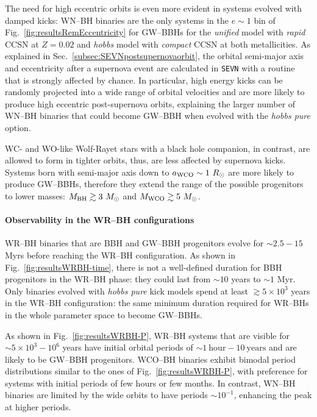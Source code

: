 \documentclass[a4paper,titlepage]{book}     	%
\newcommand{\sun}{\ensuremath{_\odot}}
\newcommand{\msun}{\ensuremath{M\sun}}
\newcommand{\rsun}{R_{\odot}}
\begin{document}
The need for high eccentric orbits is even more evident in systems evolved with damped kicks: WN--BH binaries are the only systems in the $e \sim 1$ bin of Fig.\ \ref{fig:resultsRemEccentricity} for GW--BBHs for the \emph{unified} model with \emph{rapid} CCSN at $Z=0.02$ and \emph{hobbs} model with \emph{compact} CCSN at both metallicities. As explained in Sec.\ \ref{subsec:SEVNpostsupernovaorbit}, the orbital semi-major axis and eccentricity after a supernova event are calculated in \texttt{SEVN} with a routine that is strongly affected by chance. In particular, high energy kicks can be randomly projected into a wide range of orbital velocities and are more likely to produce high eccentric post-supernova orbits, explaining the larger number of WN--BH binaries that could become GW--BBH when evolved with the \emph{hobbs pure} option.

WC- and WO-like Wolf-Rayet stars with a black hole companion, in contrast, are allowed to form in tighter orbits, thus, are less affected by supernova kicks. Systems born with semi-major axis down to $a_{\rm WCO} \sim 1~\rsun$ are more likely to produce GW--BBHs, therefore they extend the range of the possible progenitors to lower masses: $M_{\rm BH} \gtrsim 3~\msun$ and $M_{\rm WCO} \gtrsim 5~\msun$.


\paragraph{Observability in the WR--BH configurations}

WR--BH binaries that are BBH and GW--BBH progenitors evolve for $\sim 2.5 - 15$ Myrs before reaching the WR--BH configuration. As shown in Fig.\ \ref{fig:resultsWRBH-time}, there is not a well-defined duration for BBH progenitors in the WR--BH phase: they could last from $\sim 10$ years to $\sim 1$ Myr. Only binaries evolved with \emph{hobbs pure} kick models spend at least $\gtrsim 5 \times 10^3$ years in the WR--BH configuration: the same minimum duration required for WR--BHs in the whole parameter space to become GW--BBHs. 

As shown in Fig.\ \ref{fig:resultsWRBH-P}, WR--BH systems that are visible for $\sim 5 \times 10^3 - 10^6$ years have initial orbital periods of $\sim 1~\text{hour} - 10~\text{years}$ and are likely to be GW--BBH progenitors. WCO--BH binaries exhibit bimodal period distributions similar to the ones of Fig.\ \ref{fig:resultsWRBH-P}, with preference for systems with initial periods of few hours or few months. In contrast, WN--BH binaries are limited by the wide orbits to have periods $\sim 10^{-1}$, enhancing the peak at higher periods.\\
\end{document}
